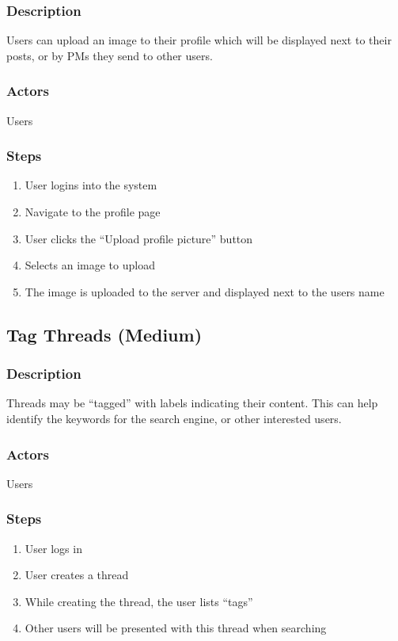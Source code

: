 \documentclass[12pt]{scrartcl}
\begin{document}
\subsubsection{Description}

Users can upload an image to their profile which will be displayed next to their posts, or by PMs they send to other users.

\subsubsection{Actors}

Users

\subsubsection{Steps}
\begin{enumerate}
\item User logins into the system
\item Navigate to the profile page
\item User clicks the ``Upload profile picture'' button
\item Selects an image to upload
\item The image is uploaded to the server and displayed next to the users name
\end{enumerate}



\subsection{Tag Threads (Medium)}
\subsubsection{Description}

Threads may be ``tagged'' with labels indicating their content. This can help identify the keywords for the search engine, or other interested users.

\subsubsection{Actors}

Users

\subsubsection{Steps}
\begin{enumerate}
\item User logs in
\item User creates a thread
\item While creating the thread, the user lists ``tags''
\item Other users will be presented with this thread when searching
\end{enumerate}
\end{document}
